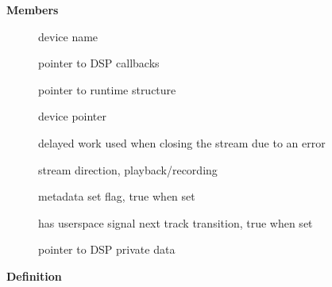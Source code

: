 \documentclass[a4paper,8pt,english]{sphinxmanual}
\begin{document}
\textbf{Members}
\begin{description}
\item[{}] \leavevmode
device name

\item[{}] \leavevmode
pointer to DSP callbacks

\item[{}] \leavevmode
pointer to runtime structure

\item[{}] \leavevmode
device pointer

\item[{}] \leavevmode
delayed work used when closing the stream due to an error

\item[{}] \leavevmode
stream direction, playback/recording

\item[{}] \leavevmode
metadata set flag, true when set

\item[{}] \leavevmode
has userspace signal next track transition, true when set

\item[{}] \leavevmode
pointer to DSP private data

\end{description}

\begin{fulllineitems}
\label{sound/kernel-api/alsa-driver-api:c.snd_compr_ops}
\end{fulllineitems}


\textbf{Definition}
\end{document}
